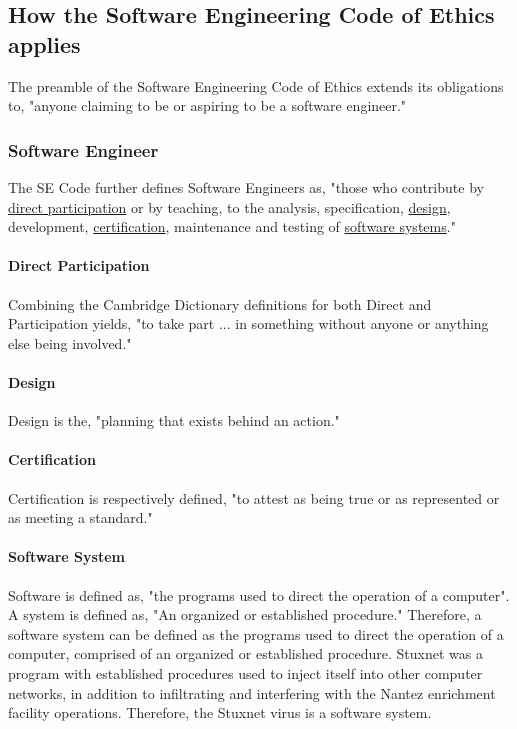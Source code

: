 \documentclass[12pt]{article}
\begin{document}
\begin{multicols}{2}
\subsection{How the Software Engineering Code of Ethics applies}

The preamble of the Software Engineering Code of Ethics extends its obligations to, "anyone claiming to be or aspiring to be a software engineer."\cite{softwareEngineeringCodeOfEthics}

\subsubsection{Software Engineer}

The SE Code further defines Software Engineers as, "those who contribute by \underline{direct participation} or by teaching, to the analysis, specification, \underline{design}, development, \underline{certification}, maintenance and testing of \underline{software systems}."

\paragraph{Direct Participation}

Combining the Cambridge Dictionary definitions for both Direct and Participation yields, "to take part ... in something without anyone or anything else being involved."\cite{cambridgeDictionary}

\paragraph{Design}
Design is the, "planning that exists behind an action."\cite{designDefinition}

\paragraph{Certification}
Certification is respectively defined, "to attest as being true or as represented or as meeting a standard."\cite{cambridgeDictionary}

\paragraph{Software System}

Software is defined as, "the programs used to direct the operation of a computer".\cite{softwareDefinition} A system is defined as, "An organized or established procedure."\cite{merriamWebsterDefinitions} Therefore, a software system can be defined as the programs used to direct the operation of a computer, comprised of an organized or established procedure. Stuxnet was a program with established procedures used to inject itself into other computer networks, in addition to infiltrating and interfering with the Nantez enrichment facility operations. Therefore, the Stuxnet virus is a software system.\cite{w32.stuxnetDossier}


\end{multicols}
\end{document}

